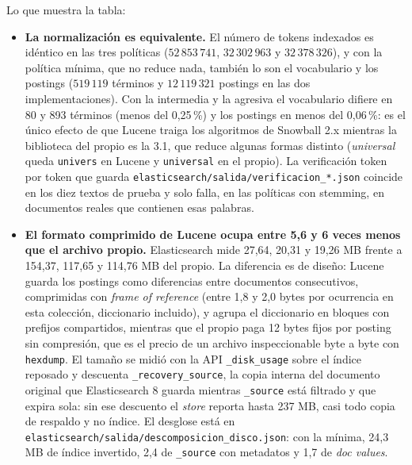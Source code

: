 \documentclass[11pt,spanish]{article}
\begin{document}
Lo que muestra la tabla:
\begin{itemize}
  \item \textbf{La normalización es equivalente.} El número de tokens indexados es idéntico en las tres políticas ($52\,853\,741$, $32\,302\,963$ y $32\,378\,326$), y con la política mínima, que no reduce nada, también lo son el vocabulario y los postings ($519\,119$ términos y $12\,119\,321$ postings en las dos implementaciones). Con la intermedia y la agresiva el vocabulario difiere en 80 y 893 términos (menos del 0,25\,\%) y los postings en menos del 0,06\,\%: es el único efecto de que Lucene traiga los algoritmos de Snowball 2.x mientras la biblioteca del propio es la 3.1, que reduce algunas formas distinto (\textit{universal} queda \texttt{univers} en Lucene y \texttt{universal} en el propio). La verificación token por token que guarda \texttt{elasticsearch/salida/verificacion\_*.json} coincide en los diez textos de prueba y solo falla, en las políticas con stemming, en documentos reales que contienen esas palabras.
  \item \textbf{El formato comprimido de Lucene ocupa entre 5,6 y 6 veces menos que el archivo propio.} Elasticsearch mide 27,64, 20,31 y 19,26 MB frente a 154,37, 117,65 y 114,76 MB del propio. La diferencia es de diseño: Lucene guarda los postings como diferencias entre documentos consecutivos, comprimidas con \emph{frame of reference} (entre 1,8 y 2,0 bytes por ocurrencia en esta colección, diccionario incluido), y agrupa el diccionario en bloques con prefijos compartidos, mientras que el propio paga 12 bytes fijos por posting sin compresión, que es el precio de un archivo inspeccionable byte a byte con \texttt{hexdump}. El tamaño se midió con la API \texttt{\_disk\_usage} sobre el índice reposado y descuenta \texttt{\_recovery\_source}, la copia interna del documento original que Elasticsearch 8 guarda mientras \texttt{\_source} está filtrado y que expira sola: sin ese descuento el \emph{store} reporta hasta 237 MB, casi todo copia de respaldo y no índice. El desglose está en \texttt{elasticsearch/salida/descomposicion\_disco.json}: con la mínima, 24,3 MB de índice invertido, 2,4 de \texttt{\_source} con metadatos y 1,7 de \emph{doc values}.

\end{itemize}
\end{document}
